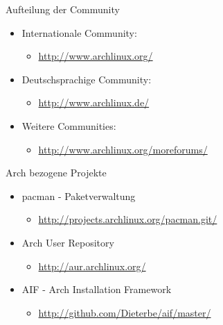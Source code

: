 

\begin{slide}{Aufteilung der Community}
	\begin{itemize}
		\item{Internationale Community:
			\begin{itemize}
				\item{\url{http://www.archlinux.org/}}
			\end{itemize}
		}
		\item{Deutschsprachige Community:
			\begin{itemize}
				\item{\url{http://www.archlinux.de/}}
			\end{itemize}
		}
		\item{Weitere Communities:
			\begin{itemize}
				\item{\url{http://www.archlinux.org/moreforums/}}
			\end{itemize}
		}
	\end{itemize}
\end{slide}

\begin{slide}{Arch bezogene Projekte}
	\begin{itemize}
		\item{pacman - Paketverwaltung
			\begin{itemize}
				\item{\url{http://projects.archlinux.org/pacman.git/}}
			\end{itemize}
		}
		\item{Arch User Repository
			\begin{itemize}
				\item{\url{http://aur.archlinux.org/}}
			\end{itemize}
		}
		\item{AIF - Arch Installation Framework
			\begin{itemize}
				\item{\url{http://github.com/Dieterbe/aif/master/}}
			\end{itemize}
		}
	\end{itemize}
\end{slide}

